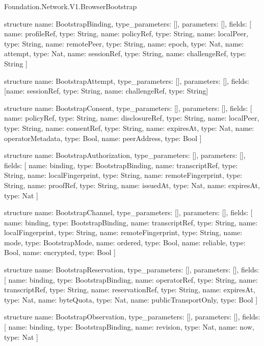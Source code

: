 \begin{lexlean}{Foundation.Network.V1.BrowserBootstrap}
\begin{semanticmodule}
structure{
  name: BootstrapBinding,
  type_parameters: [],
  parameters: [],
  fields: [
    {name: profileRef, type: String},
    {name: policyRef, type: String},
    {name: localPeer, type: String},
    {name: remotePeer, type: String},
    {name: epoch, type: Nat},
    {name: attempt, type: Nat},
    {name: sessionRef, type: String},
    {name: challengeRef, type: String}
  ]
}

structure{
  name: BootstrapAttempt,
  type_parameters: [],
  parameters: [],
  fields: [{name: sessionRef, type: String}, {name: challengeRef, type: String}]
}

structure{
  name: BootstrapConsent,
  type_parameters: [],
  parameters: [],
  fields: [
    {name: policyRef, type: String},
    {name: disclosureRef, type: String},
    {name: localPeer, type: String},
    {name: consentRef, type: String},
    {name: expiresAt, type: Nat},
    {name: operatorMetadata, type: Bool},
    {name: peerAddress, type: Bool}
  ]
}

structure{
  name: BootstrapAuthorization,
  type_parameters: [],
  parameters: [],
  fields: [
    {name: binding, type: BootstrapBinding},
    {name: transcriptRef, type: String},
    {name: localFingerprint, type: String},
    {name: remoteFingerprint, type: String},
    {name: proofRef, type: String},
    {name: issuedAt, type: Nat},
    {name: expiresAt, type: Nat}
  ]
}

structure{
  name: BootstrapChannel,
  type_parameters: [],
  parameters: [],
  fields: [
    {name: binding, type: BootstrapBinding},
    {name: transcriptRef, type: String},
    {name: localFingerprint, type: String},
    {name: remoteFingerprint, type: String},
    {name: mode, type: BootstrapMode},
    {name: ordered, type: Bool},
    {name: reliable, type: Bool},
    {name: encrypted, type: Bool}
  ]
}

structure{
  name: BootstrapReservation,
  type_parameters: [],
  parameters: [],
  fields: [
    {name: binding, type: BootstrapBinding},
    {name: operatorRef, type: String},
    {name: transcriptRef, type: String},
    {name: reservationRef, type: String},
    {name: expiresAt, type: Nat},
    {name: byteQuota, type: Nat},
    {name: publicTransportOnly, type: Bool}
  ]
}

structure{
  name: BootstrapObservation,
  type_parameters: [],
  parameters: [],
  fields: [
    {name: binding, type: BootstrapBinding},
    {name: revision, type: Nat},
    {name: now, type: Nat}
  ]
}


\end{semanticmodule}
\end{lexlean}
